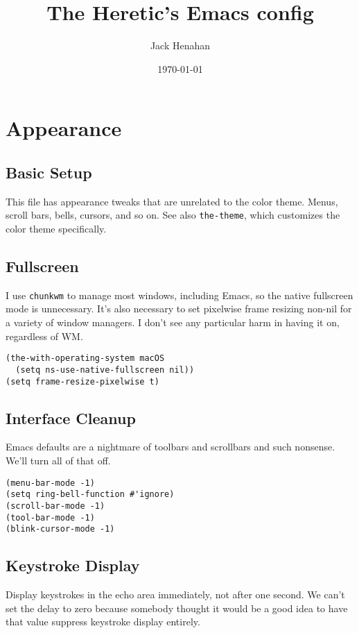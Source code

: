 \documentclass[11pt]{article}
\author{Jack Henahan}
\date{\today}
\title{The Heretic's Emacs config}
\begin{document}
\maketitle
\tableofcontents


\section{Appearance}
\label{sec:org2c601f1}
\subsection{Basic Setup}
\label{sec:orga7dcfe7}
This file has appearance tweaks that are unrelated to the color
theme. Menus, scroll bars, bells, cursors, and so on. See also
\texttt{the-theme}, which customizes the color theme specifically.

\subsection{Fullscreen}
\label{sec:org1110216}
I use \texttt{chunkwm} to manage most windows, including Emacs, so the native
fullscreen mode is unnecessary. It's also necessary to set pixelwise
frame resizing non-nil for a variety of window managers. I don't see
any particular harm in having it on, regardless of WM.

\begin{verbatim}
(the-with-operating-system macOS
  (setq ns-use-native-fullscreen nil))
(setq frame-resize-pixelwise t)
\end{verbatim}

\subsection{Interface Cleanup}
\label{sec:org7473f87}
Emacs defaults are a nightmare of toolbars and scrollbars and such
nonsense. We'll turn all of that off.

\begin{verbatim}
(menu-bar-mode -1)
(setq ring-bell-function #'ignore)
(scroll-bar-mode -1)
(tool-bar-mode -1)
(blink-cursor-mode -1)
\end{verbatim}

\subsection{Keystroke Display}
\label{sec:orgf279716}
Display keystrokes in the echo area immediately, not after one
second. We can't set the delay to zero because somebody thought it
would be a good idea to have that value suppress keystroke display
entirely.
\end{document}
